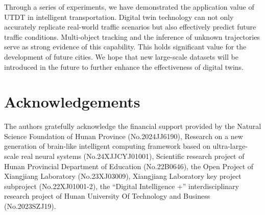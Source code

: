 \documentclass[lettersize,journal]{IEEEtran}
\begin{document}
Through a series of experiments, we have demonstrated the application value of UTDT in intelligent transportation. 
Digital twin technology can not only accurately replicate real-world traffic scenarios but also effectively predict future traffic conditions. 
Multi-object tracking and the inference of unknown trajectories serve as strong evidence of this capability. 
This holds significant value for the development of future cities.
We hope that new large-scale datasets will be introduced in the future to further enhance the effectiveness of digital twins.

\section{Acknowledgements}
The authors gratefully acknowledge the financial support provided by the Natural Science Foundation of Hunan Province (No.2024JJ6190), Research on a new generation of brain-like intelligent computing framework based on ultra-large-scale real neural systems (No.24XJJCYJ01001), Scientific research project of Hunan Provincial Department of Education (No.22B0646), the Open Project of Xiangjiang Laboratory (No.23XJ03009), Xiangjiang Laboratory key project subproject (No.22XJ01001-2), the “Digital Intelligence +” interdisciplinary research project of Hunan University Of Technology and Business (No.2023SZJ19).



\end{document}

